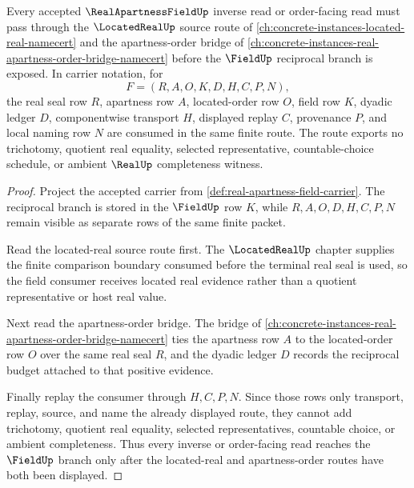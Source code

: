 \begin{theorem}
\label{thm:real-apartness-field-located-real-route}
Every accepted $\RealApartnessFieldUp$ inverse read or order-facing read must pass through the $\LocatedRealUp$ source route of \autoref{ch:concrete-instances-located-real-namecert} and the apartness-order bridge of \autoref{ch:concrete-instances-real-apartness-order-bridge-namecert} before the $\FieldUp$ reciprocal branch is exposed. In carrier notation, for
$$
F=(R,A,O,K,D,H,C,P,N),
$$
the real seal row $R$, apartness row $A$, located-order row $O$, field row $K$, dyadic ledger $D$, componentwise transport $H$, displayed replay $C$, provenance $P$, and local naming row $N$ are consumed in the same finite route. The route exports no trichotomy, quotient real equality, selected representative, countable-choice schedule, or ambient $\RealUp$ completeness witness.
\end{theorem}
\begin{proof}
Project the accepted carrier from \autoref{def:real-apartness-field-carrier}. The reciprocal branch is stored in the $\FieldUp$ row $K$, while $R,A,O,D,H,C,P,N$ remain visible as separate rows of the same finite packet.

Read the located-real source route first. The $\LocatedRealUp$ chapter supplies the finite comparison boundary consumed before the terminal real seal is used, so the field consumer receives located real evidence rather than a quotient representative or host real value.

Next read the apartness-order bridge. The bridge of \autoref{ch:concrete-instances-real-apartness-order-bridge-namecert} ties the apartness row $A$ to the located-order row $O$ over the same real seal $R$, and the dyadic ledger $D$ records the reciprocal budget attached to that positive evidence.

Finally replay the consumer through $H,C,P,N$. Since those rows only transport, replay, source, and name the already displayed route, they cannot add trichotomy, quotient real equality, selected representatives, countable choice, or ambient completeness. Thus every inverse or order-facing read reaches the $\FieldUp$ branch only after the located-real and apartness-order routes have both been displayed.
\end{proof}
